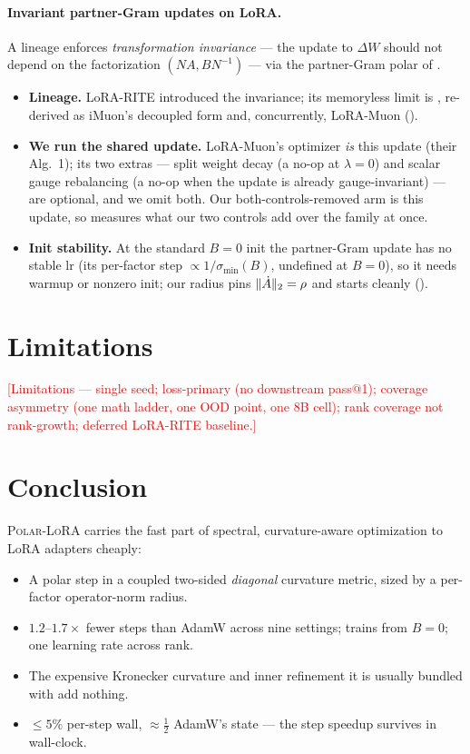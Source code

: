 \documentclass[11pt]{article}
\DeclarePairedDelimiter{\norm}{\lVert}{\rVert}
\newcommand{\DW}{\Delta W}
\newcommand{\methodname}{\textsc{Polar-LoRA}\xspace}
\newcommand{\PLACEHOLDER}[1]{\textcolor{red}{[#1]}}
\theoremstyle{plain}
\theoremstyle{definition}
\theoremstyle{remark}
\begin{document}
\paragraph{Invariant partner-Gram updates on LoRA.} A lineage enforces \emph{transformation invariance} --- the update to $\DW$ should not depend on the factorization $(NA,BN^{-1})$ --- via the partner-Gram polar of .
\begin{itemize}[leftmargin=1.5em,itemsep=1pt,topsep=2pt]
  \item \textbf{Lineage.} LoRA-RITE \cite{lorarite} introduced the invariance; its memoryless limit is , re-derived as iMuon's decoupled form \cite{imuon} and, concurrently, LoRA-Muon \cite{loramuon} ().
  \item \textbf{We run the shared update.} LoRA-Muon's optimizer \emph{is} this update (their Alg.~1); its two extras --- split weight decay (a no-op at $\lambda{=}0$) and scalar gauge rebalancing (a no-op when the update is already gauge-invariant) --- are optional, and we omit both. Our both-controls-removed arm is this update, so  measures what our two controls add over the family at once.
  \item \textbf{Init stability.} At the standard $B{=}0$ init the partner-Gram update has no stable lr (its per-factor step $\propto 1/\sigma_{\min}(B)$, undefined at $B{=}0$), so it needs warmup or nonzero init; our radius pins $\norm{\dot A}_2=\rho$ and starts cleanly ().
\end{itemize}


\section{Limitations}
\label{sec:limitations}
\PLACEHOLDER{Limitations --- single seed; loss-primary (no downstream pass@1);
coverage asymmetry (one math ladder, one OOD point, one 8B cell); rank coverage not
rank-growth; deferred LoRA-RITE baseline.}

\section{Conclusion}
\label{sec:conclusion}
\methodname{} carries the fast part of spectral, curvature-aware optimization to
LoRA adapters cheaply:
\begin{itemize}[leftmargin=1.5em,itemsep=2pt,topsep=2pt]
  \item A polar step in a coupled two-sided \emph{diagonal} curvature metric, sized by a per-factor operator-norm radius.
  \item $1.2$--$1.7\times$ fewer steps than AdamW across nine settings; trains from $B{=}0$; one learning rate across rank.
  \item The expensive Kronecker curvature and inner refinement it is usually bundled with add nothing.
  \item $\le 5\%$ per-step wall, ${\approx}\tfrac12$ AdamW's state --- the step speedup survives in wall-clock.
\end{itemize}
\end{document}
